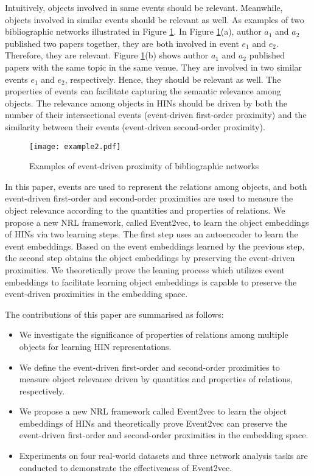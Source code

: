 Intuitively, objects involved in same events should be relevant. Meanwhile, objects involved in similar events should be relevant as well. As examples of two bibliographic networks illustrated in Figure \ref{figure2}. In Figure \ref{figure2}(a), author $a_1$ and $a_2$ published two papers together, they are both involved in event $e_1$ and $e_2$. Therefore, they are relevant. Figure \ref{figure2}(b) shows author $a_1$ and $a_2$ published papers with the same topic in the same venue. They are involved in two similar events $e_1$ and $e_2$, respectively. Hence, they should be relevant as well. The properties of events can facilitate capturing the semantic relevance among objects. The relevance among objects in HINs should be driven by both the number of their intersectional events (event-driven first-order proximity) and the similarity between their events (event-driven second-order proximity).

\begin{figure}
	\centering
	\texttt{[image: example2.pdf]}
	\caption{Examples of event-driven proximity of bibliographic networks}\label{figure2}
\end{figure}

In this paper, events are used to represent the relations among objects, and both event-driven first-order and second-order proximities are used to measure the object relevance according to the quantities and properties of relations. We propose a new NRL framework, called Event2vec, to learn the object embeddings of HINs via two learning steps. The first step uses an autoencoder to learn the event embeddings. Based on the event embeddings learned by the previous step, the second step obtains the object embeddings by preserving the event-driven proximities. We theoretically prove the leaning process which utilizes event embeddings to facilitate learning object embeddings is capable to preserve the event-driven proximities in the embedding space.

The contributions of this paper are summarised as follows:

\begin{itemize}
	\item We investigate the significance of properties of relations among multiple objects for learning HIN representations.
	\item We define the event-driven first-order and second-order proximities to measure object relevance driven by quantities and properties of relations, respectively.
	\item We propose a new NRL framework called Event2vec to learn the object embeddings of HINs and theoretically prove Event2vec can preserve the event-driven first-order and second-order proximities in the embedding space.
	\item Experiments on four real-world datasets and three network analysis tasks are conducted to demonstrate the effectiveness of Event2vec.
\end{itemize}

